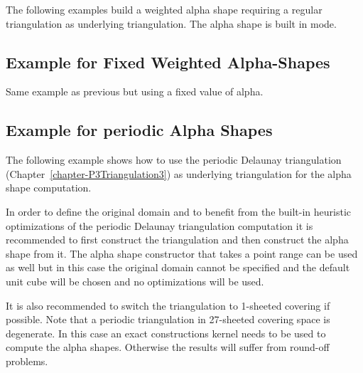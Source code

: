 The following examples build a weighted alpha shape requiring a
regular triangulation as underlying triangulation.
The alpha shape is built in  mode.



\subsection{Example for Fixed Weighted Alpha-Shapes\label{I1_SectFxWeightedAS3D}}

Same example as previous but using a fixed value of alpha.


\subsection{Example for periodic
  Alpha Shapes\label{l1_SectPeriodicAS3D}}

The following example shows how to use the periodic Delaunay
triangulation (Chapter~\ref{chapter-P3Triangulation3}) as underlying
triangulation for the alpha shape computation.

In order to define the original domain and to benefit from the
built-in heuristic optimizations of the periodic Delaunay
triangulation computation it is recommended to first construct the
triangulation and then construct the alpha shape from it. The alpha
shape constructor that takes a point range can be used as well but in
this case the original domain cannot be specified and the default unit
cube will be chosen and no optimizations will be used.

It is also recommended to switch the triangulation to 1-sheeted
covering if possible. Note that a periodic triangulation in 27-sheeted
covering space is degenerate. In this case an exact constructions
kernel needs to be used to compute the alpha shapes. Otherwise the
results will suffer from round-off problems.




